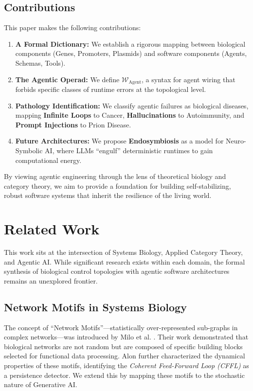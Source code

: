 \documentclass[11pt, a4paper]{article}
\newcommand{\Operad}{\mathcal{W}_{\text{Agent}}}
\begin{document}
\subsection{Contributions}
This paper makes the following contributions:
\begin{enumerate}
    \item \textbf{A Formal Dictionary:} We establish a rigorous mapping between biological components (Genes, Promoters, Plasmids) and software components (Agents, Schemas, Tools).
    \item \textbf{The Agentic Operad:} We define $\Operad$, a syntax for agent wiring that forbids specific classes of runtime errors at the topological level.
    \item \textbf{Pathology Identification:} We classify agentic failures as biological diseases, mapping \textbf{Infinite Loops} to Cancer, \textbf{Hallucinations} to Autoimmunity, and \textbf{Prompt Injections} to Prion Disease.
    \item \textbf{Future Architectures:} We propose \textbf{Endosymbiosis} as a model for Neuro-Symbolic AI, where LLMs ``engulf'' deterministic runtimes to gain computational energy.
\end{enumerate}


By viewing agentic engineering through the lens of theoretical biology and category theory, we aim to provide a foundation for building self-stabilizing, robust software systems that inherit the resilience of the living world.

\section{Related Work}

This work sits at the intersection of Systems Biology, Applied Category Theory, and Agentic AI. While significant research exists within each domain, the formal synthesis of biological control topologies with agentic software architectures remains an unexplored frontier.

\subsection{Network Motifs in Systems Biology}
The concept of ``Network Motifs''---statistically over-represented sub-graphs in complex networks---was introduced by Milo et al. \cite{milo2002network}. Their work demonstrated that biological networks are not random but are composed of specific building blocks selected for functional data processing. Alon \cite{alon2007network} further characterized the dynamical properties of these motifs, identifying the \textit{Coherent Feed-Forward Loop (CFFL)} as a persistence detector. We extend this by mapping these motifs to the stochastic nature of Generative AI.
\end{document}
